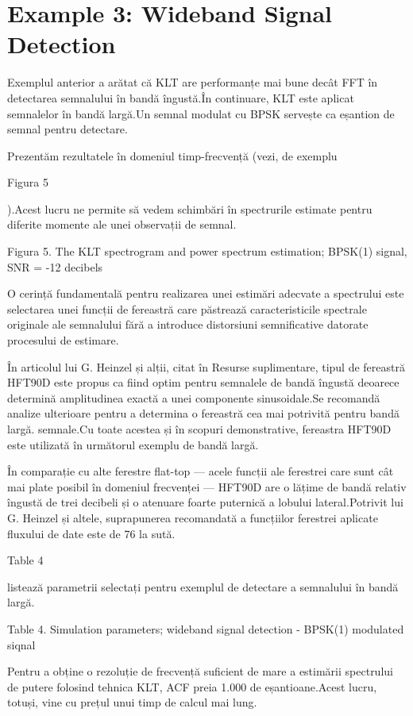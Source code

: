 \documentclass[12pt]{report}
\begin{document}
\section*{Example 3: Wideband Signal Detection}

Exemplul anterior a arătat că KLT are performanțe mai bune decât FFT în detectarea semnalului în bandă îngustă.\@ În continuare, KLT este aplicat semnalelor în bandă largă.\@ Un semnal modulat cu BPSK servește ca eșantion de semnal pentru detectare.

Prezentăm rezultatele în domeniul timp-frecvență (vezi, de exemplu \begin{normalsize}\color{red}Figura 5\end{normalsize}).\@ Acest lucru ne permite să vedem schimbări în spectrurile estimate pentru diferite momente ale unei observații de semnal.
\begin{center}
	\color{blue}Figura 5. The KLT spectrogram and power spectrum estimation; BPSK(1) signal, SNR = -12 decibels
\end{center}

O cerință fundamentală pentru realizarea unei estimări adecvate a spectrului este selectarea unei funcții de fereastră care păstrează caracteristicile spectrale originale ale semnalului fără a introduce distorsiuni semnificative datorate procesului de estimare.

În articolul lui G. Heinzel și alții, citat în Resurse suplimentare, tipul de fereastră HFT90D este propus ca fiind optim pentru semnalele de bandă îngustă deoarece determină amplitudinea exactă a unei componente sinusoidale.\@ Se recomandă analize ulterioare pentru a determina o fereastră cea mai potrivită pentru bandă largă. semnale.\@ Cu toate acestea și în scopuri demonstrative, fereastra HFT90D este utilizată în următorul exemplu de bandă largă.

În comparație cu alte ferestre flat-top — acele funcții ale ferestrei care sunt cât mai plate posibil în domeniul frecvenței — HFT90D are o lățime de bandă relativ îngustă de trei decibeli și o atenuare foarte puternică a lobului lateral.\@ Potrivit lui G. Heinzel și altele, suprapunerea recomandată a funcțiilor ferestrei aplicate fluxului de date este de 76 la sută.\ \begin{normalsize}\color{red}Table 4\end{normalsize} listează parametrii selectați pentru exemplul de detectare a semnalului în bandă largă.
\begin{center}
	\color{blue}Table 4. Simulation parameters; wideband signal detection - BPSK(1) modulated
	siqnal
\end{center}
Pentru a obține o rezoluție de frecvență suficient de mare a estimării spectrului de putere folosind tehnica KLT, ACF preia 1.000 de eșantioane.\@ Acest lucru, totuși, vine cu prețul unui timp de calcul mai lung.
\end{document}
